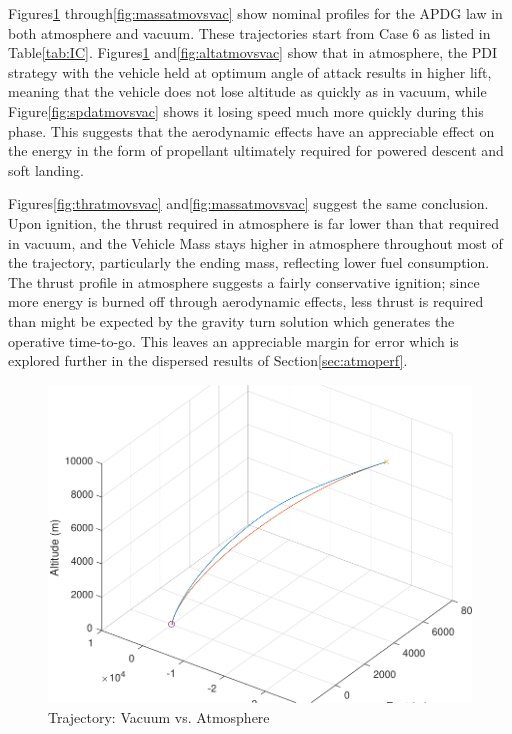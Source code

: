 Figures\:\ref{fig:trajatmovsvac} through\:\ref{fig:massatmovsvac} show nominal profiles for the APDG law in both atmosphere and vacuum. These trajectories start from Case 6 as listed in Table\:\ref{tab:IC}. Figures\:\ref{fig:trajatmovsvac} and\:\ref{fig:altatmovsvac} show that in atmosphere, the PDI strategy with the vehicle held at optimum angle of attack results in higher lift, meaning that the vehicle does not lose altitude as quickly as in vacuum, while Figure\:\ref{fig:spdatmovsvac} shows it losing speed much more quickly during this phase. This suggests that the aerodynamic effects have an appreciable effect on the energy in the form of propellant ultimately required for powered descent and soft landing. 

Figures\:\ref{fig:thratmovsvac} and\:\ref{fig:massatmovsvac} suggest the same conclusion. Upon ignition, the thrust required in atmosphere is far lower than that required in vacuum, and the Vehicle Mass stays higher in atmosphere throughout most of the trajectory, particularly the ending mass, reflecting lower fuel consumption. The thrust profile in atmosphere suggests a fairly conservative ignition; since more energy is burned off through aerodynamic effects, less thrust is required than might be expected by the gravity turn solution which generates the operative time-to-go. This leaves an appreciable margin for error which is explored further in the dispersed results of Section\:\ref{sec:atmoperf}.


\begin{figure}[H]
	\centering
	\begin{minipage}{4.3 in}
		\includegraphics[width=\linewidth]{Figures/trajatmovsvac.pdf}
		\caption{Trajectory: Vacuum vs. Atmosphere \label{fig:trajatmovsvac} }
	\end{minipage}
\end{figure}


